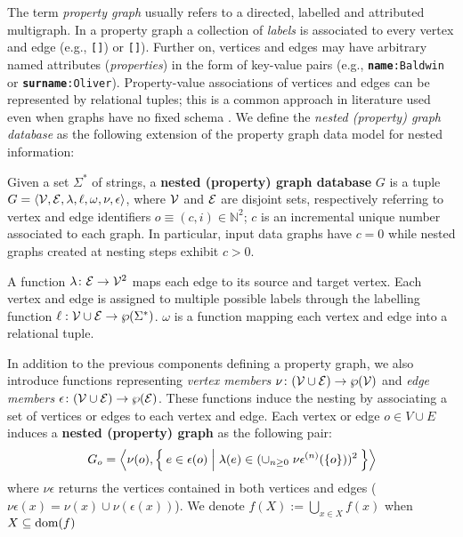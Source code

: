 The term \textit{property graph}  \cite{angles12} usually refers to a directed, labelled and attributed multigraph. 
In a property graph a collection of \textit{labels} \cite{bergamimm17} is associated to every vertex and edge (e.g., \texttt{[}\texttt{]}) or \texttt{[}\texttt{]}). Further on, vertices and edges may have arbitrary named attributes (\textit{properties}) in the form of key-value pairs (e.g., \texttt{\textbf{name}:Baldwin} or \texttt{\textbf{surname}:Oliver}). Property-value associations of vertices and edges can be represented by relational tuples; this is a common approach in literature used even when graphs have no fixed schema \cite{angles12}. We define the\textit{ nested (property) graph database} as the following extension of the property graph data model for nested information:

\begin{definition}
Given a set $\Sigma^*$ of strings,
	a \textbf{nested (property) graph database} $G$ is a tuple $G=\Braket{\mathcal{V}, \mathcal{E}, \lambda,\ell,\omega,\nu,\epsilon}$, where $\mathcal{V}$ and $\mathcal{E}$ are disjoint sets, respectively referring to vertex and edge identifiers $o\equiv(c,i)\in\mathbb{N}^2$; $c$ is an incremental unique number associated to each graph. In particular, input data graphs have $c=0$ while  nested graphs created at nesting steps exhibit $c>0$. 
	
	A function $\lambda\colon \mathcal{E}\to \mathcal{V}^2$ maps each edge to its source and target vertex. Each vertex and edge is assigned to multiple possible labels through the labelling function $\ell:\mathcal{V}\cup \mathcal{E}\to \wp(\Sigma^*)$.  $\omega$ is a function mapping each vertex and edge into a relational tuple.
	
	In addition to the previous components defining a property graph, we also introduce functions representing \textit{vertex members} $\nu\colon (\mathcal{V}\cup \mathcal{E})\to\wp(\mathcal{V})$ and \textit{edge members} $\epsilon\colon(\mathcal{V}\cup \mathcal{E})\to \wp(\mathcal{E})$. These functions induce the nesting by associating a set of vertices or edges to each vertex and edge. Each vertex or edge $o\in V\cup E$ induces a \textbf{nested (property) graph} as the following pair:
	\[G_o=\Braket{\nu(o),\Set{e\in\epsilon(o)|\lambda(e)\in (\cup_{n\geq 0}\;{\nu\epsilon}^{(n)}(\{o\}))^2}}\]
	where ${\nu\epsilon}$ returns the vertices contained in both vertices and edges ($\nu\epsilon(x)=\nu(x)\cup \nu(\epsilon(x))$). We denote $f(X){:=}\bigcup_{x\in X} f(x)$ when $X\subseteq \textup{dom}(f)$
\end{definition}


